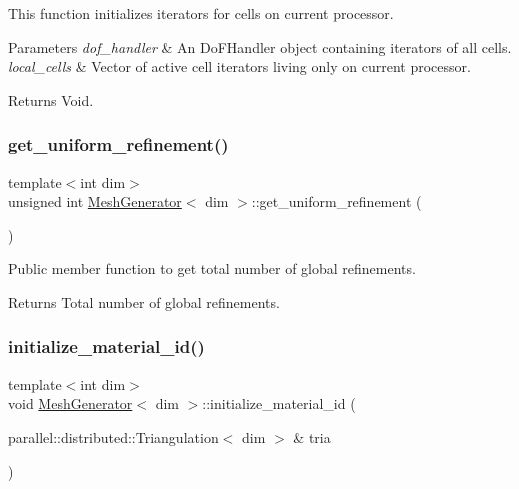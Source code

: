This function initializes iterators for cells on current processor.


\begin{DoxyParams}{Parameters}
{\em dof\+\_\+handler} & An Do\+F\+Handler object containing iterators of all cells. \\
\hline
{\em local\+\_\+cells} & Vector of active cell iterators living only on current processor. \\
\hline
\end{DoxyParams}
\begin{DoxyReturn}{Returns}
Void. 
\end{DoxyReturn}
\mbox{\label{class_mesh_generator_aabb238d5d787e8c9834e4a31d2cc5ea9}} 
\subsubsection{\texorpdfstring{get\+\_\+uniform\+\_\+refinement()}{get\_uniform\_refinement()}}
{\footnotesize\ttfamily template$<$int dim$>$ \\
unsigned int \hyperlink{class_mesh_generator}{Mesh\+Generator}$<$ dim $>$\+::get\+\_\+uniform\+\_\+refinement (\begin{DoxyParamCaption}{ }\end{DoxyParamCaption})}

Public member function to get total number of global refinements.

\begin{DoxyReturn}{Returns}
Total number of global refinements. 
\end{DoxyReturn}
\mbox{\label{class_mesh_generator_a8c0f48b88435360f1209251253912411}} 
\subsubsection{\texorpdfstring{initialize\+\_\+material\+\_\+id()}{initialize\_material\_id()}}
{\footnotesize\ttfamily template$<$int dim$>$ \\
void \hyperlink{class_mesh_generator}{Mesh\+Generator}$<$ dim $>$\+::initialize\+\_\+material\+\_\+id (\begin{DoxyParamCaption}\item[{parallel\+::distributed\+::\+Triangulation$<$ dim $>$ \&}]{tria }\end{DoxyParamCaption})\hspace{0.3cm}{\ttfamily [private]}}

